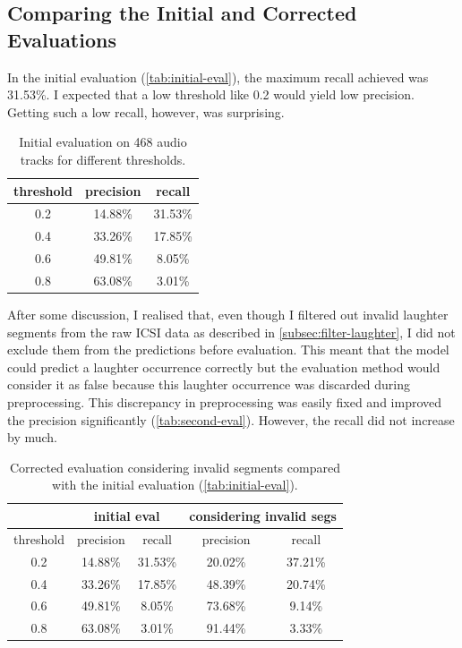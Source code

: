 \documentclass[bsc,frontabs,parskip,deptreport]{infthesis}
\begin{document}
\subsection{Comparing the Initial and Corrected Evaluations}
In the initial evaluation (\autoref{tab:initial-eval}), the maximum recall achieved was 31.53\%. I expected that a low threshold like 0.2 would yield low precision. Getting such a low recall, however, was surprising. 
\begin{table}[h!]
    \centering
    \begin{tabular}{|c|c|c|}
    \hline
    threshold & precision & recall \\
    \hline
        0.2 &  14.88\% & 31.53\% \\ 
        0.4 &  33.26\% & 17.85\% \\
        0.6 &  49.81\% & 8.05\%  \\
        0.8 &  63.08\% & 3.01\%  \\
     \hline
    \end{tabular}
    \caption{Initial evaluation on 468 audio tracks for different thresholds.}
    \label{tab:initial-eval}
\end{table}



After some discussion, I realised that, even though I filtered out invalid laughter segments from the raw ICSI data as described in \autoref{subsec:filter-laughter}, I did not exclude them from the predictions before evaluation. 
This meant that the model could predict a laughter occurrence correctly but the evaluation method would consider it as false because this laughter occurrence was discarded during preprocessing.
This discrepancy in preprocessing was easily fixed and improved the precision significantly (\autoref{tab:second-eval}). However, the recall did not increase by much. 

\begin{table}[h!]
    \centering
    \begin{tabular}{|c|c|c|c|c|}
    \hline
    & \multicolumn{2}{|c|}{initial eval} & \multicolumn{2}{|c|}{considering invalid segs} \\
    \hline 
    threshold & precision & recall & precision & recall \\
    \hline
        0.2 &  14.88\% & 31.53\% & 20.02\% & 37.21\%\\ 
        0.4 &  33.26\% & 17.85\% & 48.39\% & 20.74\%\\ 
        0.6 &  49.81\% & 8.05\% & 73.68\% & 9.14\%  \\ 
        0.8 &  63.08\% & 3.01\% & 91.44\% & 3.33\%  \\ 
     \hline
    \end{tabular}
    \caption{Corrected evaluation considering invalid segments compared with the initial evaluation (\autoref{tab:initial-eval}).}
    \label{tab:second-eval}
\end{table}
\end{document}
